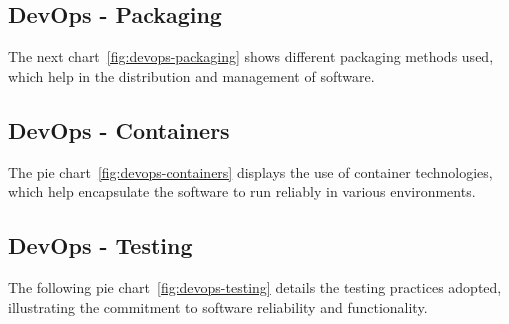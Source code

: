 
\subsection{DevOps - Packaging}

The next chart~\ref{fig:devops-packaging} shows different packaging methods used, which help in the distribution and management of software.


\subsection{DevOps - Containers}

The pie chart~\ref{fig:devops-containers} displays the use of container technologies, which help encapsulate the software to run reliably in various environments.


\subsection{DevOps - Testing}

The following pie chart~\ref{fig:devops-testing} details the testing practices adopted, illustrating the commitment to software reliability and functionality.



